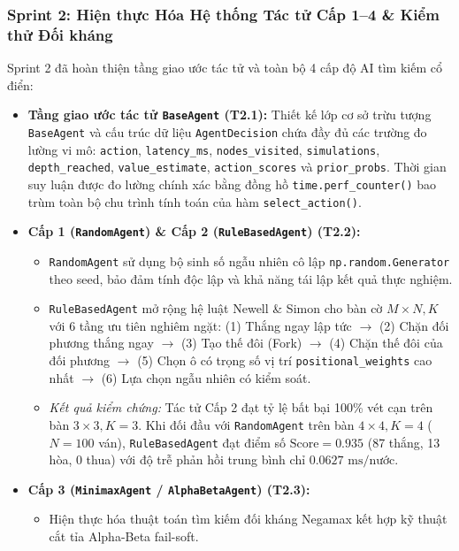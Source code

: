 \documentclass[a4paper,12pt]{report}
\begin{document}
\subsubsection{Sprint 2: Hiện thực Hóa Hệ thống Tác tử Cấp 1--4 \& Kiểm thử Đối kháng}
Sprint 2 đã hoàn thiện tầng giao ước tác tử và toàn bộ 4 cấp độ AI tìm kiếm cổ điển:
\begin{itemize}
    \item \textbf{Tầng giao ước tác tử \texttt{BaseAgent} (T2.1):} Thiết kế lớp cơ sở trừu tượng \texttt{BaseAgent} và cấu trúc dữ liệu \texttt{AgentDecision} chứa đầy đủ các trường đo lường vi mô: \texttt{action}, \texttt{latency\_\allowbreak ms}, \texttt{nodes\_\allowbreak visited}, \texttt{simulations}, \texttt{depth\_\allowbreak reached}, \texttt{value\_\allowbreak estimate}, \texttt{action\_\allowbreak scores} và \texttt{prior\_\allowbreak probs}. Thời gian suy luận được đo lường chính xác bằng đồng hồ \texttt{time.\allowbreak perf\_\allowbreak counter()} bao trùm toàn bộ chu trình tính toán của hàm \texttt{select\_\allowbreak action()}.
    \item \textbf{Cấp 1 (\texttt{RandomAgent}) \& Cấp 2 (\texttt{RuleBasedAgent}) (T2.2):}
    \begin{itemize}
        \item \texttt{RandomAgent} sử dụng bộ sinh số ngẫu nhiên cô lập \texttt{np.random.Generator} theo seed, bảo đảm tính độc lập và khả năng tái lập kết quả thực nghiệm.
        \item \texttt{RuleBasedAgent} mở rộng hệ luật Newell \& Simon cho bàn cờ $M \times N, K$ với 6 tầng ưu tiên nghiêm ngặt: (1) Thắng ngay lập tức $\rightarrow$ (2) Chặn đối phương thắng ngay $\rightarrow$ (3) Tạo thế đôi (Fork) $\rightarrow$ (4) Chặn thế đôi của đối phương $\rightarrow$ (5) Chọn ô có trọng số vị trí \texttt{positional\_\allowbreak weights} cao nhất $\rightarrow$ (6) Lựa chọn ngẫu nhiên có kiểm soát.
        \item \textit{Kết quả kiểm chứng:} Tác tử Cấp 2 đạt tỷ lệ bất bại 100\% vét cạn trên bàn $3 \times 3, K=3$. Khi đối đầu với \texttt{RandomAgent} trên bàn $4 \times 4, K=4$ ($N=100$ ván), \texttt{RuleBasedAgent} đạt điểm số $\text{Score} = 0.935$ (87 thắng, 13 hòa, 0 thua) với độ trễ phản hồi trung bình chỉ $0.0627\text{ ms/nước}$.
    \end{itemize}
    \item \textbf{Cấp 3 (\texttt{MinimaxAgent} / \texttt{AlphaBetaAgent}) (T2.3):}
    \begin{itemize}
        \item Hiện thực hóa thuật toán tìm kiếm đối kháng Negamax kết hợp kỹ thuật cắt tỉa Alpha-Beta fail-soft.

\end{itemize}
\end{itemize}
\end{document}
